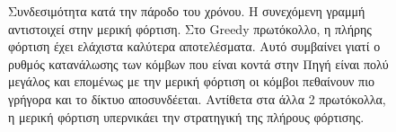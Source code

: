 \begin{figure}[H]
  \centering
  \caption{Συνδεσιμότητα κατά την πάροδο του χρόνου. Η συνεχόμενη γραμμή αντιστοιχεί στην μερική φόρτιση. Στο Greedy πρωτόκολλο, η πλήρης φόρτιση έχει ελάχιστα
καλύτερα αποτελέσματα. Αυτό συμβαίνει γιατί ο ρυθμός κατανάλωσης των κόμβων που είναι κοντά στην Πηγή είναι πολύ μεγάλος και επομένως με την μερική φόρτιση οι κόμβοι
πεθαίνουν πιο γρήγορα και το δίκτυο αποσυνδέεται. Αντίθετα στα άλλα 2 πρωτόκολλα, η μερική φόρτιση υπερνικάει την στρατηγική της πλήρους φόρτισης.}
  \label{fig:2exp_2_1}
\end{figure}


